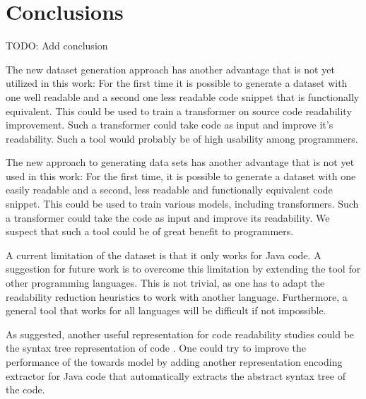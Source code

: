 \documentclass[%
class=scrreprt,
chapterprefix=false,%
open=right,%
twoside=false,%
paper=a4,%
logofile={Logo\_zentral\_farbig\_EN.png},%
thesistype=master,%
UKenglish,%
]{se2thesis}
\theoremstyle{definition}
\begin{document}
\section{Conclusions} \label{Conclusions}
	TODO: Add conclusion
	
	The new dataset generation approach has another advantage that is not yet utilized in this work: For the first time it is possible to generate a dataset with one well readable and a second one less readable code snippet that is functionally equivalent. This could be used to train a transformer on source code readability improvement. Such a transformer could take code as input and improve it's readability. Such a tool would probably be of high usability among programmers.
	
	The new approach to generating data sets has another advantage that is not yet used in this work: For the first time, it is possible to generate a dataset with one easily readable and a second, less readable and functionally equivalent code snippet. This could be used to train various models, including transformers. Such a transformer could take the code as input and improve its readability. We suspect that such a tool could be of great benefit to programmers.
	
	A current limitation of the dataset is that it only works for Java code. A suggestion for future work is to overcome this limitation by extending the tool for other programming languages. This is not trivial, as one has to adapt the readability reduction heuristics to work with another language. Furthermore, a general tool that works for all languages will be difficult if not impossible.
	
	
	As \citeauthor{mi2023graph} suggested, another useful representation for code readability studies could be the syntax tree representation of code \cite{mi2023graph}. One could try to improve the performance of the towards model by adding another representation encoding extractor for Java code that automatically extracts the abstract syntax tree of the code.
	
\end{document}
